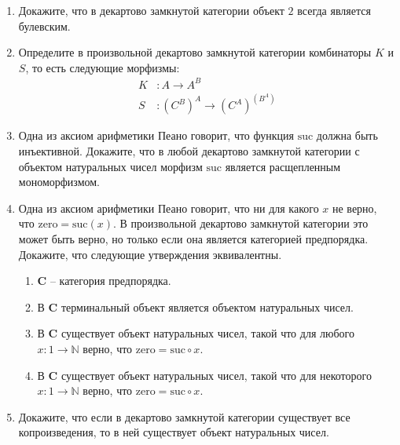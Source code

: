 \documentclass[draft]{article}
\newcommand{\cat}[1]{\mathbf{#1}}
\renewcommand{\C}{\cat{C}}
\newcommand{\zero}{\mathrm{zero}}
\newcommand{\suc}{\mathrm{suc}}
\begin{document}
\begin{enumerate}
\item Докажите, что в декартово замкнутой категории объект $2$ всегда является булевским.

\item Определите в произвольной декартово замкнутой категории комбинаторы $K$ и $S$, то есть следующие морфизмы:
\begin{align*}
K & : A \to A^B \\
S & : (C^B)^A \to (C^A)^{(B^A)}
\end{align*}

\item Одна из аксиом арифметики Пеано говорит, что функция $\suc$ должна быть инъективной.
Докажите, что в любой декартово замкнутой категории с объектом натуральных чисел морфизм $\suc$ является расщепленным мономорфизмом.

\item Одна из аксиом арифметики Пеано говорит, что ни для какого $x$ не верно, что $\zero = \suc(x)$.
В произвольной декартово замкнутой категории это может быть верно, но только если она является категорией предпорядка.
Докажите, что следующие утверждения эквивалентны.
\begin{enumerate}
\item $\C$ -- категория предпорядка.
\item В $\C$ терминальный объект является объектом натуральных чисел.
\item В $\C$ существует объект натуральных чисел, такой что для любого $x : 1 \to \mathbb{N}$ верно, что $\zero = \suc \circ x$.
\item В $\C$ существует объект натуральных чисел, такой что для некоторого $x : 1 \to \mathbb{N}$ верно, что $\zero = \suc \circ x$.
\end{enumerate}

\item Докажите, что если в декартово замкнутой категории существует все копроизведения, то в ней существует объект натуральных чисел.


\end{enumerate}
\end{document}
